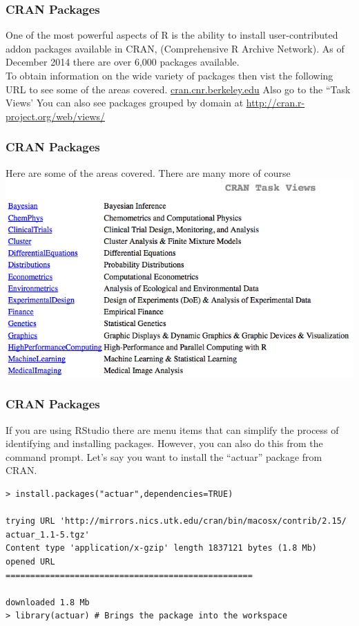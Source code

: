 \documentclass{beamer}
\begin{document}

\begin{frame}[fragile]
\frametitle{CRAN Packages}
One of the most powerful aspects of R is the ability to install user-contributed addon packages available in CRAN, (Comprehensive R Archive Network). As of December 2014 there are over 6,000 packages available. 
\newline
\\
To obtain information on the wide variety of packages then vist the following URL to see some of the areas covered. \url{cran.cnr.berkeley.edu} Also go to the ``Task Views' You can also see packages grouped by domain at \url{http://cran.r-project.org/web/views/}

\end{frame}


\begin{frame}[fragile]
\frametitle{CRAN Packages}
Here are some of the areas covered. There are many more of course
\newline
\\
\includegraphics{../IMG/taskviews.png}
\end{frame}


\begin{frame}[fragile]
\frametitle{CRAN Packages}
If you are using RStudio there are menu items that can simplify the process of identifying and installing packages. However, you can  also do this from the command prompt. Let's say you want to install the ``actuar'' package from CRAN.
\newline
\\
\footnotesize
\begin{verbatim}
> install.packages("actuar",dependencies=TRUE)

trying URL 'http://mirrors.nics.utk.edu/cran/bin/macosx/contrib/2.15/
actuar_1.1-5.tgz'
Content type 'application/x-gzip' length 1837121 bytes (1.8 Mb)
opened URL
==================================================

downloaded 1.8 Mb
> library(actuar) # Brings the package into the workspace
\end{verbatim}
\end{frame}
\end{document}
